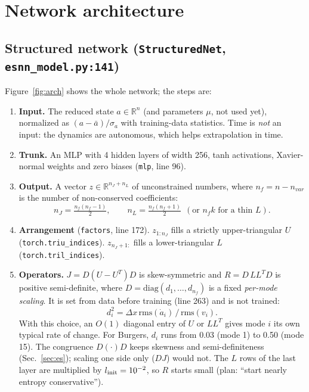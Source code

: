\documentclass[11pt,a4paper]{article}
\newcommand{\code}[1]{\texttt{\small #1}}
\begin{document}
\section{Network architecture}\label{sec:arch}

\subsection{Structured network (\code{StructuredNet}, \code{esnn\_model.py:141})}
Figure~\ref{fig:arch} shows the whole network; the steps are:
\begin{enumerate}
\item \textbf{Input.} The reduced state $a\in\mathbb R^n$ (and parameters $\mu$, not used yet), normalized as $(a-\bar a)/\sigma_a$ with training-data statistics. Time is \emph{not} an input: the dynamics are autonomous, which helps extrapolation in time.
\item \textbf{Trunk.} An MLP with 4 hidden layers of width 256, tanh activations, Xavier-normal weights and zero biases (\code{mlp}, line 96).
\item \textbf{Output.} A vector $z\in\mathbb R^{n_J+n_L}$ of unconstrained numbers, where $n_f=n-n_{var}$ is the number of non-conserved coefficients:
\[ n_J = \tfrac{n_f(n_f-1)}{2},\qquad n_L=\tfrac{n_f(n_f+1)}{2}\ \ (\text{or } n_fk \text{ for a thin } L). \]
\item \textbf{Arrangement} (\code{factors}, line 172). $z_{1:n_J}$ fills a strictly upper-triangular $U$ (\code{torch.triu\_indices}). $z_{n_J+1:}$ fills a lower-triangular $L$ (\code{torch.tril\_indices}).
\item \textbf{Operators.} $J=D(U-U^T)D$ is skew-symmetric and $R=D\,LL^TD$ is positive semi-definite, where $D=\mathrm{diag}(d_1,\dots,d_{n_f})$ is a fixed \emph{per-mode scaling}. It is set from data before training (line 263) and is not trained:
\[ d_i^2=\Delta x\,\mathrm{rms}(\dot a_i)\,/\,\mathrm{rms}(v_i). \]
With this choice, an $O(1)$ diagonal entry of $U$ or $LL^T$ gives mode $i$ its own typical rate of change. For Burgers, $d_i$ runs from 0.03 (mode 1) to 0.50 (mode 15). The congruence $D(\cdot)D$ keeps skewness and semi-definiteness (Sec.~\ref{sec:es}); scaling one side only ($DJ$) would not. The $L$ rows of the last layer are multiplied by $l_{\rm init}=10^{-2}$, so $R$ starts small (plan: ``start nearly entropy conservative'').


\end{enumerate}
\end{document}
